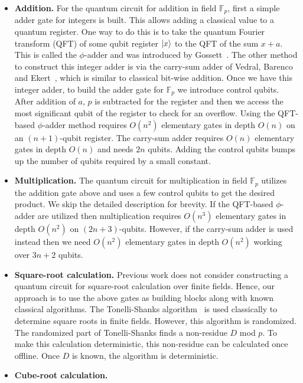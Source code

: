 \begin{itemize}
    \item \textbf{Addition.} For the quantum circuit for addition in field $\mathbb{F}_p$, first a simple adder gate for integers is built. This allows adding a classical value to a quantum register. One way to do this is to take the quantum Fourier transform (QFT) of some qubit register $\ket{x}$ to the QFT of the sum $x + a$. This is called the $\phi$-adder and was introduced by Gossett~\cite{quantumCarrySave}. The other method to construct this integer adder is via the carry-sum adder of Vedral, Barenco and Ekert~\cite{Vedral_Barenco_Ekert_1996}, which is similar to classical bit-wise addition. Once we have this integer adder, to build the adder gate for $\mathbb{F}_p$ we introduce control qubits. After addition of $a$, $p$ is subtracted for the register and then we access the most significant qubit of the register to check for an overflow. Using the QFT-based $\phi$-adder method requires $O(n^2)$ elementary gates in depth $O(n)$ on an $(n+1)$-qubit register. The carry-sum adder requires $O(n)$ elementary gates in depth $O(n)$ and needs $2n$ qubits.  Adding the control qubits bumps up the number of qubits required by a small constant. 

\item \textbf{Multiplication.} The quantum circuit for multiplication in field $\mathbb{F}_p$ utilizes the addition gate above and uses a few control qubits to get the desired product. We skip the detailed description for brevity. If the QFT-based $\phi$-adder are utilized then multiplication requires $O(n^3)$ elementary gates in depth $O(n^2)$ on $(2n+3)$-qubits. However, if the carry-sum adder is used instead then we need $O(n^2)$ elementary gates in depth $O(n^2)$ working over $3n+2$ qubits.

\item \textbf{Square-root calculation.} Previous work does not consider constructing a quantum circuit for square-root calculation over finite fields. Hence, our approach is to use the above gates as building blocks along with known classical algorithms. The Tonelli-Shanks algorithm~\cite{Shanks} is used classically to determine square roots in finite fields. However, this algorithm is randomized. The randomized part of Tonelli-Shanks finds a non-residue $D$ mod $p$. To make this calculation deterministic, this non-residue can be calculated once offline. Once $D$ is known, the algorithm is deterministic.

\item \textbf{Cube-root calculation.}

\end{itemize}
 
